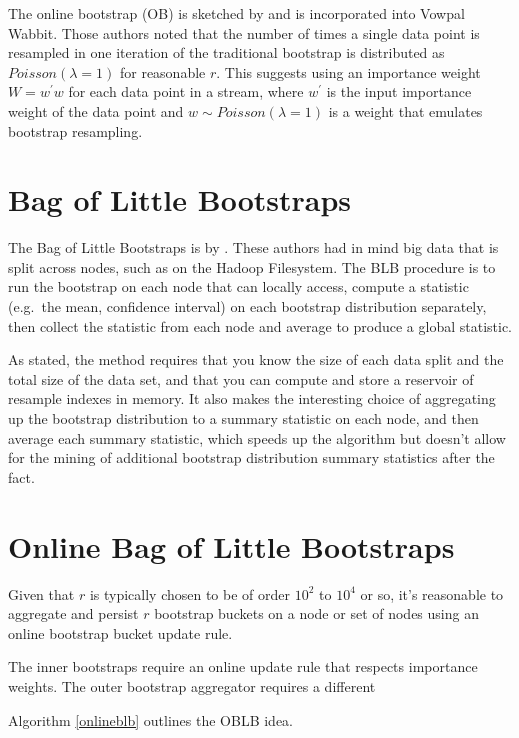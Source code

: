 \documentclass{article}
\begin{document}
The online bootstrap (OB) is sketched by \cite{bib:onlineboot} and is
incorporated into Vowpal Wabbit. Those authors noted that the number of times
a single data point is resampled in one iteration of the traditional bootstrap
is distributed as $Poisson(\lambda = 1)$ for reasonable $r$. This suggests
using an importance weight $W = w^{\prime}w$ for each data point in a stream,
where $w^{\prime}$ is the input importance weight of the data point and $w
\sim Poisson(\lambda = 1)$ is a weight that emulates bootstrap resampling.

\section{Bag of Little Bootstraps}

The Bag of Little Bootstraps is by \cite{bib:blb}. These authors had in mind
big data that is split across nodes, such as on the Hadoop Filesystem. The BLB
procedure is to run the bootstrap on each node that can locally access,
compute a statistic (e.g.\ the mean, confidence interval) on each bootstrap
distribution separately, then collect the statistic from each node and average
to produce a global statistic.

As stated, the method requires that you know the size of each data split and
the total size of the data set, and that you can compute and store a reservoir
of resample indexes in memory. It also makes the interesting choice of
aggregating up the bootstrap distribution to a summary statistic on each node,
and then average each summary statistic, which speeds up the algorithm but
doesn't allow for the mining of additional bootstrap distribution summary
statistics after the fact.

\section{Online Bag of Little Bootstraps}

Given that $r$ is typically chosen to be of order $10^2$ to $10^4$ or so, it's
reasonable to aggregate and persist $r$ bootstrap buckets on a node or set of
nodes using an online bootstrap bucket update rule.

The inner bootstraps require an online update rule that respects importance
weights. The outer bootstrap aggregator requires a different

Algorithm \ref{onlineblb} outlines the OBLB idea.
\end{document}
